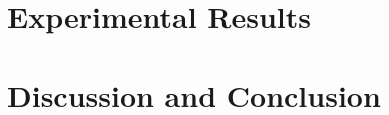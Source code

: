 \documentclass{article}
\begin{document}



\section{Experimental Results}\label{sec:experi}






\section{Discussion and Conclusion}\label{sec:dis&res}


    
\end{document}
